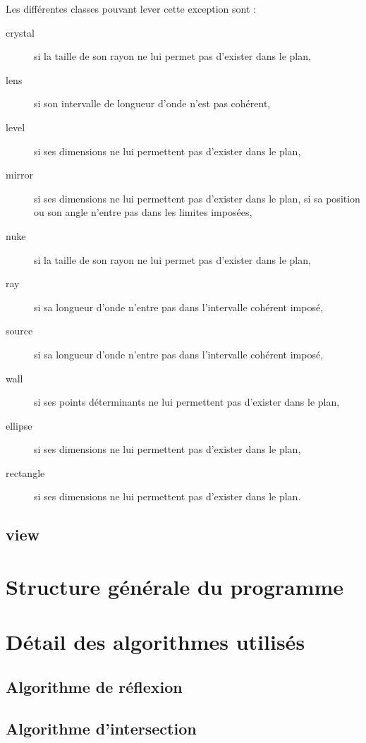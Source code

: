 \documentclass[a4paper,11pt]{report}
\begin{document}
Les différentes classes pouvant lever cette exception sont :
\begin{description}
	\item[crystal] si la taille de son rayon ne lui permet pas d'exister dans le
		plan,
	\item[lens] si son intervalle de longueur d'onde n'est pas cohérent,
	\item[level] si ses dimensions ne lui permettent pas d'exister dans le plan,
	\item[mirror] si ses dimensions ne lui permettent pas d'exister dans le
		plan, si sa position ou son angle n'entre pas dans les limites imposées,
	\item[nuke] si la taille de son rayon ne lui permet pas d'exister dans le
		plan,
	\item[ray] si sa longueur d'onde n'entre pas dans l'intervalle cohérent
		imposé,
	\item[source] si sa longueur d'onde n'entre pas dans l'intervalle cohérent
		imposé,
	\item[wall] si ses points déterminants ne lui permettent pas d'exister dans
		le plan,
	\item[ellipse] si ses dimensions ne lui permettent pas d'exister dans le
		plan,
	\item[rectangle] si ses dimensions ne lui permettent pas d'exister dans le
		plan.
\end{description}
\section[Les objets visuels]{view}


\chapter[Structure du programme]{Structure générale du programme}



\chapter[Algorithmes]{Détail des algorithmes utilisés}
\section[Réflexion]{Algorithme de réflexion}

\section[Intersection]{Algorithme d'intersection}
\end{document}
